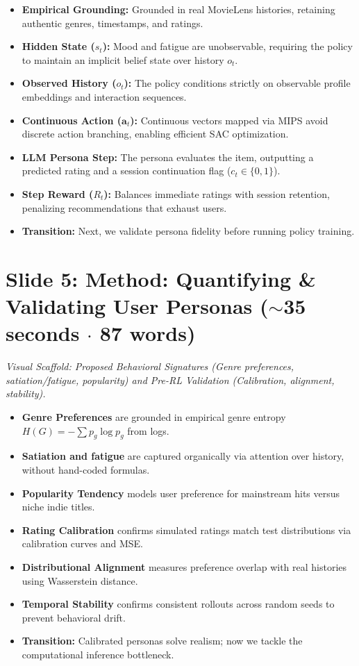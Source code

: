 \documentclass[]{0_aga-homework}
\begin{document}
\begin{itemize}
  \item \textbf{Empirical Grounding:} Grounded in real MovieLens histories, retaining authentic genres, timestamps, and ratings.
  \item \textbf{Hidden State ($s_t$):} Mood and fatigue are unobservable, requiring the policy to maintain an implicit belief state over history $o_t$.
  \item \textbf{Observed History ($o_t$):} The policy conditions strictly on observable profile embeddings and interaction sequences.
  \item \textbf{Continuous Action ($\bm{a}_t$):} Continuous vectors mapped via MIPS avoid discrete action branching, enabling efficient SAC optimization.
  \item \textbf{LLM Persona Step:} The persona evaluates the item, outputting a predicted rating and a session continuation flag ($c_t \in \{0, 1\}$).
  \item \textbf{Step Reward ($R_t$):} Balances immediate ratings with session retention, penalizing recommendations that exhaust users.
  \item \textbf{Transition:} Next, we validate persona fidelity before running policy training.
\end{itemize}

\section*{Slide 5: Method: Quantifying \& Validating User Personas ($\sim$35 seconds $\cdot$ 87 words)}
\noindent\textit{Visual Scaffold: Proposed Behavioral Signatures (Genre preferences, satiation/fatigue, popularity) and Pre-RL Validation (Calibration, alignment, stability).}

\begin{itemize}
  \item \textbf{Genre Preferences} are grounded in empirical genre entropy $H(G) = -\sum p_g \log p_g$ from logs.
  \item \textbf{Satiation and fatigue} are captured organically via attention over history, without hand-coded formulas.
  \item \textbf{Popularity Tendency} models user preference for mainstream hits versus niche indie titles.
  \item \textbf{Rating Calibration} confirms simulated ratings match test distributions via calibration curves and MSE.
  \item \textbf{Distributional Alignment} measures preference overlap with real histories using Wasserstein distance.
  \item \textbf{Temporal Stability} confirms consistent rollouts across random seeds to prevent behavioral drift.
  \item \textbf{Transition:} Calibrated personas solve realism; now we tackle the computational inference bottleneck.
\end{itemize}
\end{document}
